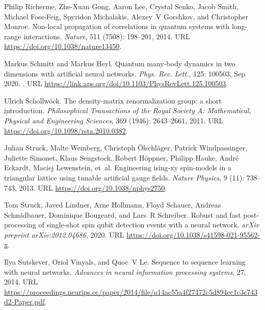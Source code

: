 \documentclass[a4paper,aps,amsmath,amssymb,twocolumn,longbibliography,,accepted=2022-05-17]{quantumarticle}
\begin{document}
\begin{thebibliography}{52}
Philip Richerme, Zhe-Xuan Gong, Aaron Lee, Crystal Senko, Jacob Smith, Michael
  Foss-Feig, Spyridon Michalakis, Alexey~V Gorshkov, and Christopher Monroe.
\newblock Non-local propagation of correlations in quantum systems with
  long-range interactions.
\newblock \emph{Nature}, 511 (7508): 198--201, 2014.
\newblock URL \url{https://doi.org/10.1038/nature13450}.

Markus Schmitt and Markus Heyl.
\newblock Quantum many-body dynamics in two dimensions with artificial neural
  networks.
\newblock \emph{Phys. Rev. Lett.}, 125: 100503, Sep 2020.
\newblock {}.
\newblock URL \url{https://link.aps.org/doi/10.1103/PhysRevLett.125.100503}.

Ulrich Schollw{\"o}ck.
\newblock The density-matrix renormalization group: a short introduction.
\newblock \emph{Philosophical Transactions of the Royal Society A:
  Mathematical, Physical and Engineering Sciences}, 369
  (1946): 2643--2661, 2011.
\newblock URL \url{https://doi.org/10.1098/rsta.2010.0382}.

Julian Struck, Malte Weinberg, Christoph {\"O}lschl{\"a}ger, Patrick
  Windpassinger, Juliette Simonet, Klaus Sengstock, Robert H{\"o}ppner, Philipp
  Hauke, Andr{\'e} Eckardt, Maciej Lewenstein, et~al.
\newblock Engineering ising-xy spin-models in a triangular lattice using
  tunable artificial gauge fields.
\newblock \emph{Nature Physics}, 9 (11): 738--743, 2013.
\newblock URL \url{https://doi.org/10.1038/nphys2750}.

Tom Struck, Javed Lindner, Arne Hollmann, Floyd Schauer, Andreas Schmidbauer,
  Dominique Bougeard, and Lars~R Schreiber.
\newblock Robust and fast post-processing of single-shot spin qubit detection
  events with a neural network.
\newblock \emph{arXiv preprint arXiv:2012.04686}, 2020.
\newblock URL \url{https://doi.org/10.1038/s41598-021-95562-x}.

Ilya Sutskever, Oriol Vinyals, and Quoc~V Le.
\newblock Sequence to sequence learning with neural networks.
\newblock \emph{Advances in neural information processing systems}, 27, 2014.
\newblock URL
  \url{https://proceedings.neurips.cc/paper/2014/file/a14ac55a4f27472c5d894ec1c3c743d2-Paper.pdf}.


\end{thebibliography}
\end{document}
